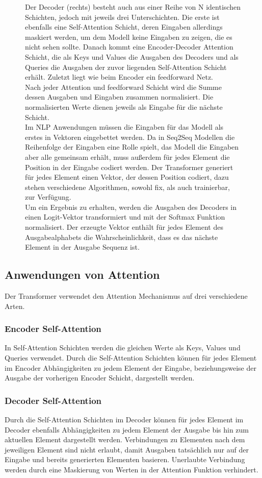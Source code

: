 \documentclass[conference]{IEEEtran}
\begin{document}
\begin{figure}[htbp]
{Der Decoder (rechts) besteht auch aus einer Reihe von N identischen Schichten, jedoch mit jeweils drei Unterschichten. Die erste ist ebenfalls eine Self-Attention Schicht, deren Eingaben allerdings maskiert werden, um dem Modell keine Eingaben zu zeigen, die es nicht sehen sollte. Danach kommt eine Encoder-Decoder Attention Schicht, die als Keys und Values die Ausgaben des Decoders und als Queries die Ausgaben der zuvor liegenden Self-Attention Schicht erhält. Zuletzt liegt wie beim Encoder ein feedforward Netz. \\
Nach jeder Attention und feedforward Schicht wird die Summe dessen Ausgaben und Eingaben zusammen normalisiert. Die normalisierten Werte dienen jeweils als Eingabe für die nächste Schicht. \\
Im NLP Anwendungen müssen die Eingaben für das Modell als erstes in Vektoren eingebettet werden. Da in Seq2Seq Modellen die Reihenfolge der Eingaben eine Rolle spielt, das Modell die Eingaben aber alle gemeinsam erhält, muss außerdem für jedes Element die Position in der Eingabe codiert werden. Der Transformer generiert für jedes Element einen Vektor, der dessen Position codiert, dazu stehen verschiedene Algorithmen, sowohl fix, als auch trainierbar, zur Verfügung. \\
Um ein Ergebnis zu erhalten, werden die Ausgaben des Decoders in einen Logit-Vektor transformiert und mit der Softmax Funktion normalisiert. Der erzeugte Vektor enthält für jedes Element des Ausgabealphabets die Wahrscheinlichkeit, dass es das nächste Element in der Ausgabe Sequenz ist. \cite{attention_is_all_you_need}}
\label{fig:1}
\end{figure}

\subsection{Anwendungen von Attention}
Der Transformer verwendet den Attention Mechanismus auf drei verschiedene Arten.
\subsubsection{Encoder Self-Attention}
In Self-Attention Schichten werden die gleichen Werte als Keys, Values und Queries verwendet. Durch die Self-Attention Schichten können für jedes Element im Encoder Abhängigkeiten zu jedem Element der Eingabe, beziehungsweise der Ausgabe der vorherigen Encoder Schicht, dargestellt werden.
\subsubsection{Decoder Self-Attention}
Durch die Self-Attention Schichten im Decoder können für jedes Element im Decoder ebenfalls Abhängigkeiten zu jedem Element der Ausgabe bis hin zum aktuellen Element dargestellt werden. Verbindungen zu Elementen nach dem jeweiligen Element sind nicht erlaubt, damit Ausgaben tatsächlich nur auf der Eingabe und bereits generierten Elementen basieren. Unerlaubte Verbindung werden durch eine Maskierung von Werten in der Attention Funktion verhindert.
\end{document}
